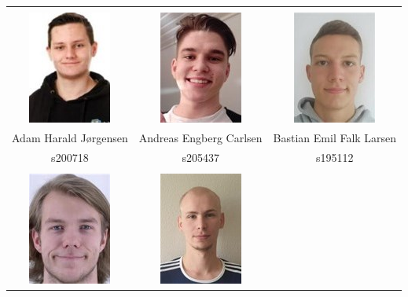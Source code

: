 \begin{titlepage}
\begin{center}
\begin{tabular}{|c|c|c|}
\hline
&&
\\
\includegraphics[scale=0.8]{figures/adam.png}
&
\includegraphics[scale=0.8]{figures/andreas.png}
&
\includegraphics[scale=0.8]{figures/bastian.png}
\\
Adam Harald Jørgensen
&
Andreas Engberg Carlsen
&
Bastian Emil Falk Larsen
\\
s200718
&
s205437
&
s195112\\
\hline
&&
\\
\includegraphics[scale=0.8]{figures/jens.png}
&
\includegraphics[scale=0.8]{figures/martin.png}

\end{tabular}
\end{center}
\end{titlepage}
